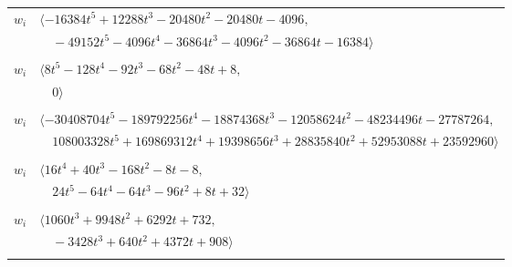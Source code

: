 \documentclass[11pt]{article}
\begin{document}
\begin{longtable}{@{}ll@{}}
$w_i$ & $\langle -16384t^{5}+12288t^{3}-20480t^{2}-20480t-4096,$\\
 & $\quad -49152t^{5}-4096t^{4}-36864t^{3}-4096t^{2}-36864t-16384\rangle$\\
\addlinespace[2pt]
\multicolumn{2}{@{}p{0.97\textwidth}@{}}{$i=64$, $D_i=16$, $\rho_{ij}$: $1{:}1, \allowbreak 4{:}1, \allowbreak 17{:}1, \allowbreak 31{:}1, \allowbreak 33{:}1, \allowbreak 37{:}2, \allowbreak 39{:}1, \allowbreak 41{:}2, \allowbreak 47{:}1, \allowbreak 59{:}2, \allowbreak 60{:}2, \allowbreak 61{:}2, \allowbreak 65{:}1, \allowbreak 66{:}1, \allowbreak 71{:}1$}\\
$w_i$ & $\langle 8t^{5}-128t^{4}-92t^{3}-68t^{2}-48t+8,$\\
 & $\quad 0\rangle$\\
\addlinespace[2pt]
\multicolumn{2}{@{}p{0.97\textwidth}@{}}{$i=65$, $D_i=131072$, $\rho_{ij}$: $5{:}1, \allowbreak 8{:}1, \allowbreak 20{:}1, \allowbreak 21{:}1, \allowbreak 23{:}2, \allowbreak 26{:}1, \allowbreak 29{:}1, \allowbreak 34{:}2, \allowbreak 37{:}2, \allowbreak 44{:}2, \allowbreak 47{:}1, \allowbreak 60{:}1, \allowbreak 64{:}2$}\\
$w_i$ & $\langle -30408704t^{5}-189792256t^{4}-18874368t^{3}-12058624t^{2}-48234496t-27787264,$\\
 & $\quad 108003328t^{5}+169869312t^{4}+19398656t^{3}+28835840t^{2}+52953088t+23592960\rangle$\\
\addlinespace[2pt]
\multicolumn{2}{@{}p{0.97\textwidth}@{}}{$i=66$, $D_i=8$, $\rho_{ij}$: $4{:}1, \allowbreak 8{:}2, \allowbreak 17{:}1, \allowbreak 22{:}2, \allowbreak 32{:}2, \allowbreak 34{:}1, \allowbreak 59{:}1, \allowbreak 64{:}2$}\\
$w_i$ & $\langle 16t^{4}+40t^{3}-168t^{2}-8t-8,$\\
 & $\quad 24t^{5}-64t^{4}-64t^{3}-96t^{2}+8t+32\rangle$\\
\addlinespace[2pt]
\multicolumn{2}{@{}p{0.97\textwidth}@{}}{$i=67$, $D_i=256$, $\rho_{ij}$: $2{:}2, \allowbreak 25{:}2, \allowbreak 29{:}1, \allowbreak 35{:}2, \allowbreak 36{:}1, \allowbreak 57{:}2, \allowbreak 62{:}1, \allowbreak 63{:}2$}\\
$w_i$ & $\langle 1060t^{3}+9948t^{2}+6292t+732,$\\
 & $\quad -3428t^{3}+640t^{2}+4372t+908\rangle$\\
\addlinespace[2pt]
\multicolumn{2}{@{}p{0.97\textwidth}@{}}{$i=68$, $D_i=4$, $\rho_{ij}$: $17{:}2, \allowbreak 33{:}1, \allowbreak 34{:}1, \allowbreak 57{:}1$}\\

\end{longtable}
\end{document}
